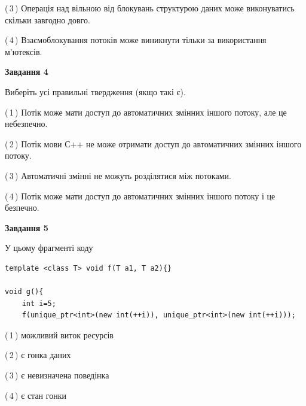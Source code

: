 \documentclass[12pt, ukrainian]{article}
\begin{document}
\begin {large}
{(\,3\,) Операція над вільною від блокувань структурою даних може виконуватись скільки завгодно довго.%

(\,4\,) Взаємоблокування потоків може виникнути тільки за використання м’ютексів.%



\begin{center}
\textbf{Завдання 4}
\end{center}
Виберіть усі правильні твердження (якщо такі є).\par
\vspace{2mm}

(\,1\,) Потік може мати доступ до автоматичних змінних іншого потоку, але це небезпечно.%

(\,2\,) Потік мови С++ не може отримати доступ до автоматичних змінних іншого потоку.%

(\,3\,) Автоматичні змінні не можуть розділятися між потоками.%

(\,4\,) Потік може мати доступ до автоматичних змінних іншого потоку і це безпечно.%



\begin{center}
\textbf{Завдання 5}
\end{center}
У цьому фрагменті коду
\begin{verbatim}
template <class T> void f(T a1, T a2){}

void g(){
    int i=5;
    f(unique_ptr<int>(new int(++i)), unique_ptr<int>(new int(++i)));
\end{verbatim}

(\,1\,) можливий виток ресурсів%

(\,2\,) є гонка даних%

(\,3\,) є невизначена поведінка%

(\,4\,) є стан гонки%


}
\end {large}
\end{document}
